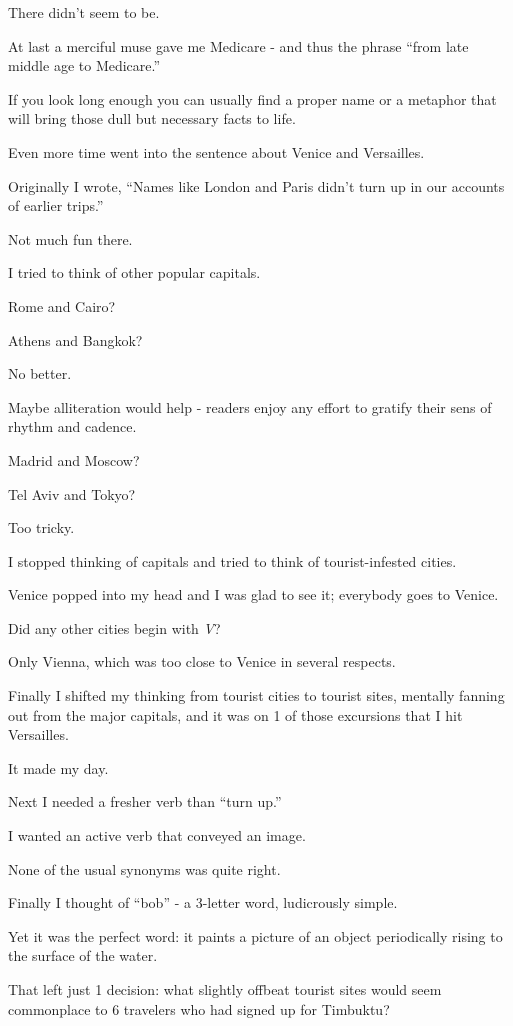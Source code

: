 \documentclass{book}
\numberwithin{equation}{section}
\begin{document}
There didn't seem to be.

At last a merciful muse gave me Medicare - and thus the phrase ``from late middle age to Medicare.''

If you look long enough you can usually find a proper name or a metaphor that will bring those dull but necessary facts to life.

Even more time went into the sentence about Venice and Versailles.

Originally I wrote, ``Names like London and Paris didn't turn up in our accounts of earlier trips.''

Not much fun there.

I tried to think of other popular capitals.

Rome and Cairo?

Athens and Bangkok?

No better.

Maybe alliteration would help - readers enjoy any effort to gratify their sens of rhythm and cadence.

Madrid and Moscow?

Tel Aviv and Tokyo?

Too tricky.

I stopped thinking of capitals and tried to think of tourist-infested cities.

Venice popped into my head and I was glad to see it; everybody goes to Venice.

Did any other cities begin with \textit{V}?

Only Vienna, which was too close to Venice in several respects.

Finally I shifted my thinking from tourist cities to tourist sites, mentally fanning out from the major capitals, and it was on 1 of those excursions that I hit Versailles.

It made my day.

%
Next I needed a fresher verb than ``turn up.''

I wanted an active verb that conveyed an image.

None of the usual synonyms was quite right.

Finally I thought of ``bob'' - a 3-letter word, ludicrously simple.

Yet it was the perfect word: it paints a picture of an object periodically rising to the surface of the water.

That left just 1 decision: what slightly offbeat tourist sites would seem commonplace to 6 travelers who had signed up for Timbuktu?
\end{document}
